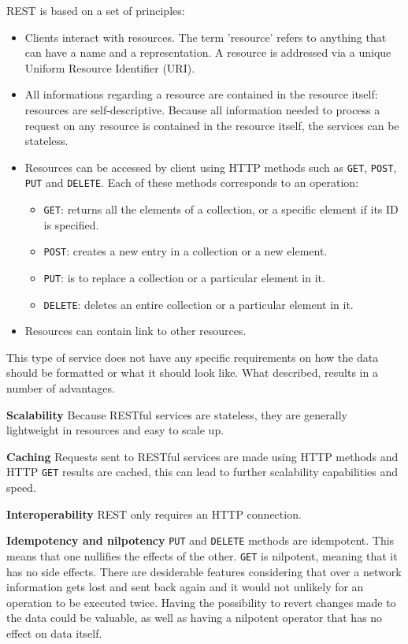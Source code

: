 REST is based on a set of principles:
\begin{itemize}
\item Clients interact with resources. The term 'resource' refers to anything that can have a name and a representation.
      A resource is addressed via a unique Uniform Resource Identifier (URI).
\item All informations regarding a resource are contained in the resource itself: resources are self-descriptive.
      Because all information needed to process a request on any resource is contained in the resource itself,
      the services can be stateless.
\item Resources can be accessed by client using HTTP methods such as \verb|GET|, \verb|POST|, \verb|PUT| and \verb|DELETE|.
      Each of these methods corresponds to an operation:
			\begin{itemize}
				\item \verb|GET|: returns all the elements of a collection, or a specific element if its ID is specified.
				\item \verb|POST|: creates a new entry in a collection or a new element.
				\item \verb|PUT|: is to replace a collection or a particular element in it.
				\item \verb|DELETE|: deletes an entire collection or a particular element in it.
			\end{itemize}
\item Resources can contain link to other resources.
\end{itemize}

This type of service does not have any specific requirements on how the data should be formatted or what it should look like.
What described, results in a number of advantages.

\textbf{Scalability}\newline
Because RESTful services are stateless, they are generally lightweight in resources and easy to scale up.

\textbf{Caching}\newline
Requests sent to RESTful services are made using HTTP methods and HTTP \verb|GET| results are cached, this can
lead to further scalability capabilities and speed.

\textbf{Interoperability}\newline
REST only requires an HTTP connection.

\textbf{Idempotency and nilpotency}\newline
\verb|PUT| and \verb|DELETE| methods are idempotent. This means that one nullifies the effects of the other.
\verb|GET| is nilpotent, meaning that it has no side effects. There are desiderable features considering
that over a network information gets lost and sent back again and it would not unlikely for an operation
to be executed twice. Having the possibility to revert changes made to the data could be valuable,
as well as having a nilpotent operator that has no effect on data itself.

